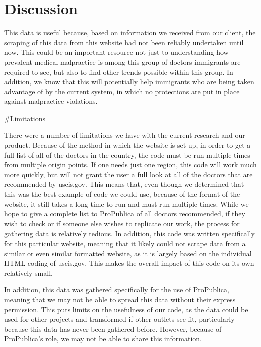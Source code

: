 \documentclass[10pt,letterpaper]{article}
\begin{document}
\hypertarget{discussion}{%
\section{Discussion}\label{discussion}}

This data is useful because, based on information we received from our
client, the scraping of this data from this website had not been
reliably undertaken until now. This could be an important resource not
just to understanding how prevalent medical malpractice is among this
group of doctors immigrants are required to see, but also to find other
trends possible within this group. In addition, we know that this will
potentially help immigrants who are being taken advantage of by the
current system, in which no protections are put in place against
malpractice violations.

\#Limitations

There were a number of limitations we have with the current research and
our product. Because of the method in which the website is set up, in
order to get a full list of all of the doctors in the country, the code
must be run multiple times from multiple origin points. If one needs
just one region, this code will work much more quickly, but will not
grant the user a full look at all of the doctors that are recommended by
uscis.gov. This means that, even though we determined that this was the
best example of code we could use, because of the format of the website,
it still takes a long time to run and must run multiple times. While we
hope to give a complete list to ProPublica of all doctors recommended,
if they wish to check or if someone else wishes to replicate our work,
the process for gathering data is relatively tedious. In addition, this
code was written specifically for this particular website, meaning that
it likely could not scrape data from a similar or even similar formatted
website, as it is largely based on the individual HTML coding of
uscis.gov. This makes the overall impact of this code on its own
relatively small.

In addition, this data was gathered specifically for the use of
ProPublica, meaning that we may not be able to spread this data without
their express permission. This puts limits on the usefulness of our
code, as the data could be used for other projects and transformed if
other outlets see fit, particularly because this data has never been
gathered before. However, because of ProPublica's role, we may not be
able to share this information.
\end{document}
